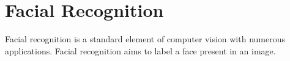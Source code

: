 \section{Facial Recognition}
  Facial recognition is a standard element of computer vision with numerous applications.
  Facial recognition aims to label a face present in an image.
  
  
